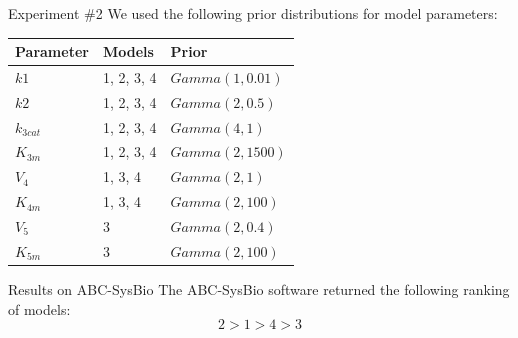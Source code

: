 \documentclass{beamer}
\begin{document}
\begin{frame}{Experiment \#2}
We used the following prior distributions for model parameters:
\begin{table}
\centering
\begin{tabular}{l l l}
Parameter   & Models     & Prior             \\ \hline
\hline
$k1$        & 1, 2, 3, 4 & $Gamma (1, 0.01)$ \\
$k2$        & 1, 2, 3, 4 & $Gamma (2, 0.5)$  \\
$k_{3cat}$  & 1, 2, 3, 4 & $Gamma (4, 1)$    \\
$K_{3m}$    & 1, 2, 3, 4 & $Gamma (2, 1500)$ \\
$V_4$       & 1, 3, 4    & $Gamma (2, 1)$    \\
$K_{4m}$    & 1, 3, 4    & $Gamma (2, 100)$  \\
$V_5$       & 3          & $Gamma (2, 0.4)$  \\
$K_{5m}$    & 3          & $Gamma (2, 100)$  \\ \hline
\end{tabular}
\end{table}
\end{frame}

\begin{frame}{Results on ABC-SysBio}
The ABC-SysBio software returned the following ranking of models:
\begin{equation*}
    2 > 1 > 4 > 3
\end{equation*}
\end{frame}
\end{document}
